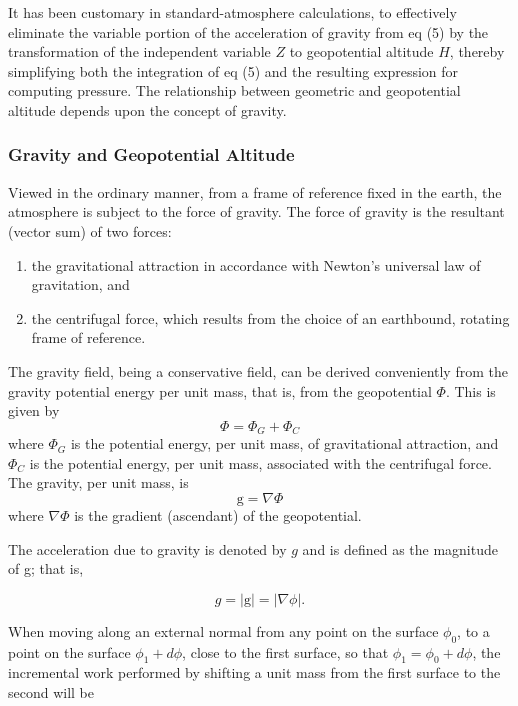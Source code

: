 \documentclass{article}
\begin{document}
It has been customary in standard-atmosphere calculations, to effectively eliminate the variable portion of the acceleration of gravity from eq (5) by the transformation of the independent variable $Z$ to geopotential altitude $H$, thereby simplifying both the integration of eq (5) and the resulting expression for computing pressure. The relationship between geometric and geopotential altitude depends upon the concept of gravity.

\subsubsection{Gravity and Geopotential Altitude}

Viewed in the ordinary manner, from a frame of reference fixed in the earth, the atmosphere is subject to the force of gravity. The force of gravity is the resultant (vector sum) of two forces:
\begin{enumerate}
    \item the gravitational attraction in accordance with Newton's universal law of gravitation, and
    \item the centrifugal force, which results from the choice of an earthbound, rotating frame of reference.
\end{enumerate}

The gravity field, being a conservative field, can be derived conveniently from the gravity potential energy per unit mass, that is, from the geopotential $\Phi$. This is given by
\[
\Phi = \Phi_G + \Phi_C \tag{10}
\]
where $\Phi_G$ is the potential energy, per unit mass, of gravitational attraction, and $\Phi_C$ is the potential energy, per unit mass, associated with the centrifugal force. The gravity, per unit mass, is
\[
 \text{g} = \nabla \Phi \tag{11}
\]
where $\nabla \Phi$ is the gradient (ascendant) of the geopotential.

The acceleration due to gravity is denoted by \(g\) and is defined as the magnitude of g; that is,

\begin{equation}
 g = |\text{g}| = |\nabla \phi|. \tag{12}
\end{equation}

When moving along an external normal from any point on the surface \(\phi_0\), to a point on the surface \(\phi_1+d\phi\), close to the first surface, so that \(\phi_1 = \phi_0 + d\phi\), the incremental work performed by shifting a unit mass from the first surface to the second will be
\end{document}
